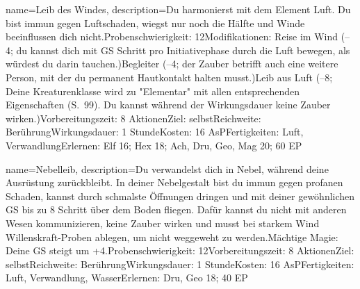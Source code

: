 {
    name={Leib des Windes},
    description={Du harmonierst mit dem Element Luft. Du bist immun gegen Luftschaden, wiegst nur noch die Hälfte und Winde beeinflussen dich nicht.\newline Probenschwierigkeit: 12\newline Modifikationen: Reise im Wind (–4; du kannst dich mit GS Schritt pro Initiativephase durch die Luft bewegen, als würdest du darin tauchen.)\newline Begleiter (–4; der Zauber betrifft auch eine weitere Person, mit der du permanent Hautkontakt halten musst.)\newline Leib aus Luft (–8; Deine Kreaturenklasse wird zu "Elementar" mit allen entsprechenden Eigenschaften (S. 99). Du kannst während der Wirkungsdauer keine Zauber wirken.)\newline Vorbereitungszeit: 8 Aktionen\newline Ziel: selbst\newline Reichweite: Berührung\newline Wirkungsdauer: 1 Stunde\newline Kosten: 16 AsP\newline Fertigkeiten: Luft, Verwandlung\newline Erlernen: Elf 16; Hex 18; Ach, Dru, Geo, Mag 20; 60 EP}
}


{
    name={Nebelleib},
    description={Du verwandelst dich in Nebel, während deine Ausrüstung zurückbleibt. In deiner Nebelgestalt bist du immun gegen profanen Schaden, kannst durch schmalste Öffnungen dringen und mit deiner gewöhnlichen GS bis zu 8 Schritt über dem Boden fliegen. Dafür kannst du nicht mit anderen Wesen kommunizieren, keine Zauber wirken und musst bei starkem Wind Willenskraft-Proben ablegen, um nicht weggeweht zu werden.\newline Mächtige Magie: Deine GS steigt um +4.\newline Probenschwierigkeit: 12\newline Vorbereitungszeit: 8 Aktionen\newline Ziel: selbst\newline Reichweite: Berührung\newline Wirkungsdauer: 1 Stunde\newline Kosten: 16 AsP\newline Fertigkeiten: Luft, Verwandlung, Wasser\newline Erlernen: Dru, Geo 18; 40 EP}
}


